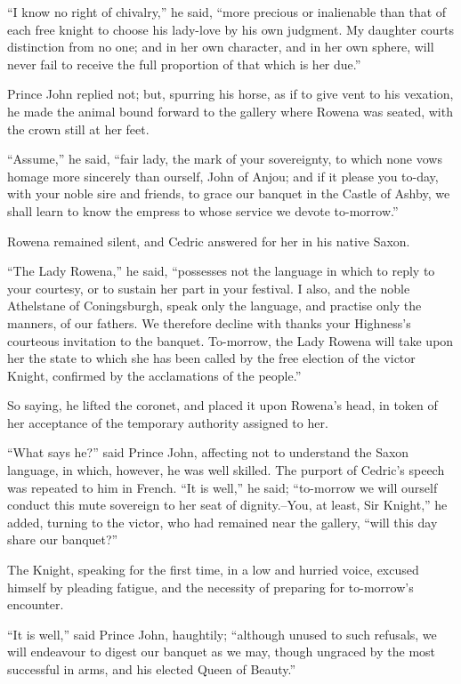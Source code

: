``I know no right of chivalry,'' he said, ``more precious or inalienable
than that of each free knight to choose his lady-love by his own
judgment. My daughter courts distinction from no one; and in her own
character, and in her own sphere, will never fail to receive the full
proportion of that which is her due.''

Prince John replied not; but, spurring his horse, as if to give vent to
his vexation, he made the animal bound forward to the gallery where
Rowena was seated, with the crown still at her feet.

``Assume,'' he said, ``fair lady, the mark of your sovereignty, to which
none vows homage more sincerely than ourself, John of Anjou; and if it
please you to-day, with your noble sire and friends, to grace our
banquet in the Castle of Ashby, we shall learn to know the empress to
whose service we devote to-morrow.''

Rowena remained silent, and Cedric answered for her in his native Saxon.

``The Lady Rowena,'' he said, ``possesses not the language in which to
reply to your courtesy, or to sustain her part in your festival. I also,
and the noble Athelstane of Coningsburgh, speak only the language, and
practise only the manners, of our fathers. We therefore decline with
thanks your Highness's courteous invitation to the banquet. To-morrow,
the Lady Rowena will take upon her the state to which she has been
called by the free election of the victor Knight, confirmed by the
acclamations of the people.''

So saying, he lifted the coronet, and placed it upon Rowena's head, in
token of her acceptance of the temporary authority assigned to her.

``What says he?'' said Prince John, affecting not to understand the
Saxon language, in which, however, he was well skilled. The purport of
Cedric's speech was repeated to him in French. ``It is well,'' he said;
``to-morrow we will ourself conduct this mute sovereign to her seat of
dignity.--You, at least, Sir Knight,'' he added, turning to the victor,
who had remained near the gallery, ``will this day share our banquet?''

The Knight, speaking for the first time, in a low and hurried voice,
excused himself by pleading fatigue, and the necessity of preparing for
to-morrow's encounter.

``It is well,'' said Prince John, haughtily; ``although unused to such
refusals, we will endeavour to digest our banquet as we may, though
ungraced by the most successful in arms, and his elected Queen of
Beauty.''

